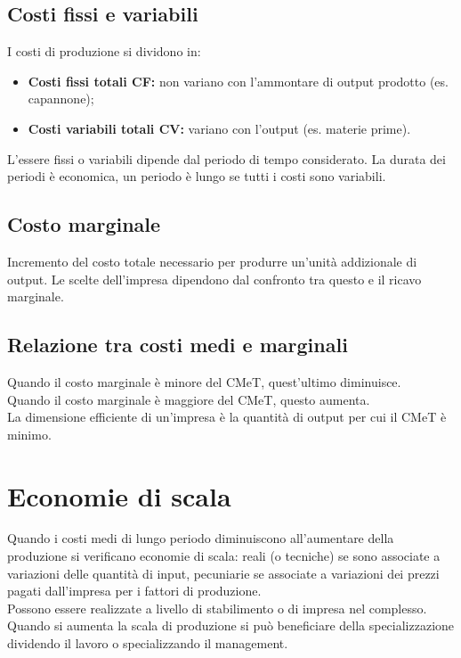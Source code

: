 \documentclass{report}
\begin{document}
	\subsection{Costi fissi e variabili}
	I costi di produzione si dividono in:
	\begin{itemize}
		\item \textbf{Costi fissi totali CF:} non variano con l'ammontare di output prodotto (es. capannone);
		\item \textbf{Costi variabili totali CV:} variano con l'output (es. materie prime).
	\end{itemize}
	L'essere fissi o variabili dipende dal periodo di tempo considerato. La durata dei periodi è economica, un periodo è lungo se tutti i costi sono variabili.
	\subsection{Costo marginale}
	Incremento del costo totale necessario per produrre un'unità addizionale di output. Le scelte dell'impresa dipendono dal confronto tra questo e il ricavo marginale.
	\subsection{Relazione tra costi medi e marginali}
	Quando il costo marginale è minore del CMeT, quest'ultimo diminuisce.
	\medskip \\
	Quando il costo marginale è maggiore del CMeT, questo aumenta.
	\medskip \\La dimensione efficiente di un'impresa è la quantità di output per cui il CMeT è minimo.
	\section{Economie di scala}
	Quando i costi medi di lungo periodo diminuiscono all'aumentare della produzione si verificano economie di scala: reali (o tecniche) se sono associate a variazioni delle quantità di input, pecuniarie se associate a variazioni dei prezzi pagati dall'impresa per i fattori di produzione.
	\medskip \\
	Possono essere realizzate a livello di stabilimento o di impresa nel complesso. Quando si aumenta la scala di produzione si può beneficiare della specializzazione dividendo il lavoro o specializzando il management.
\end{document}
